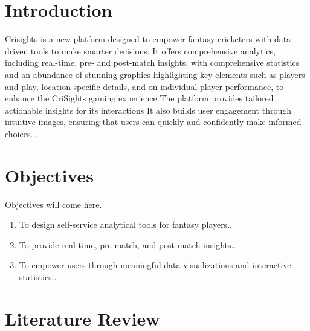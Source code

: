     
\section{Introduction}

Crisights is a new platform designed to empower fantasy cricketers with data-driven tools to make smarter decisions.
 It offers comprehensive analytics, including real-time, pre- and post-match insights, with comprehensive statistics
  and an abundance of stunning graphics highlighting key elements such as players and play, location specific details,
   and on individual player performance, to enhance the CriSights gaming experience The platform provides tailored actionable 
   insights for its interactions It also builds user engagement through intuitive images, ensuring that users can quickly and 
   confidently make informed choices.
 \cite{greenwade93}.


\section{Objectives}
Objectives will come here.
\begin{enumerate}
	\item To design self-service analytical tools for fantasy players..
	
	\item To provide real-time, pre-match, and post-match insights.. 
	
    \item To empower users through meaningful data visualizations and interactive statistics..
\end{enumerate}

\section{Literature Review}

